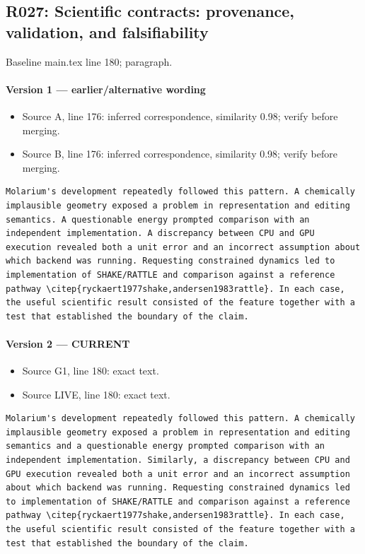 \documentclass[11pt]{article}
\begin{document}
\subsection{R027: Scientific contracts: provenance, validation, and falsifiability}

Baseline main.tex line 180; paragraph.

\paragraph{Version 1 --- earlier/alternative wording}

\begin{itemize}[leftmargin=*]
\item Source A, line 176: inferred correspondence, similarity 0.98; verify before merging.
\item Source B, line 176: inferred correspondence, similarity 0.98; verify before merging.
\end{itemize}

\begin{lstlisting}
Molarium's development repeatedly followed this pattern. A chemically implausible geometry exposed a problem in representation and editing semantics. A questionable energy prompted comparison with an independent implementation. A discrepancy between CPU and GPU execution revealed both a unit error and an incorrect assumption about which backend was running. Requesting constrained dynamics led to implementation of SHAKE/RATTLE and comparison against a reference pathway \citep{ryckaert1977shake,andersen1983rattle}. In each case, the useful scientific result consisted of the feature together with a test that established the boundary of the claim.
\end{lstlisting}

\paragraph{Version 2 --- CURRENT}

\begin{itemize}[leftmargin=*]
\item Source G1, line 180: exact text.
\item Source LIVE, line 180: exact text.
\end{itemize}

\begin{lstlisting}
Molarium's development repeatedly followed this pattern. A chemically implausible geometry exposed a problem in representation and editing semantics and a questionable energy prompted comparison with an independent implementation. Similarly, a discrepancy between CPU and GPU execution revealed both a unit error and an incorrect assumption about which backend was running. Requesting constrained dynamics led to implementation of SHAKE/RATTLE and comparison against a reference pathway \citep{ryckaert1977shake,andersen1983rattle}. In each case, the useful scientific result consisted of the feature together with a test that established the boundary of the claim.
\end{lstlisting}
\end{document}
